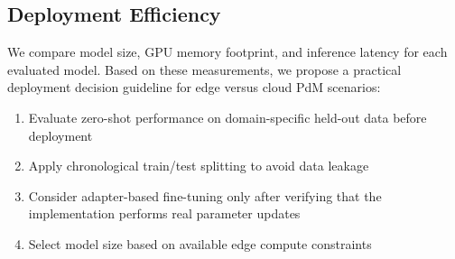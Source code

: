 \subsection{Deployment Efficiency}

We compare model size, GPU memory footprint, and inference latency for each evaluated model. Based on these measurements, we propose a practical deployment decision guideline for edge versus cloud PdM scenarios:

\begin{enumerate}
    \item Evaluate zero-shot performance on domain-specific held-out data before deployment
    \item Apply chronological train/test splitting to avoid data leakage
    \item Consider adapter-based fine-tuning only after verifying that the implementation performs real parameter updates
    \item Select model size based on available edge compute constraints
\end{enumerate}
